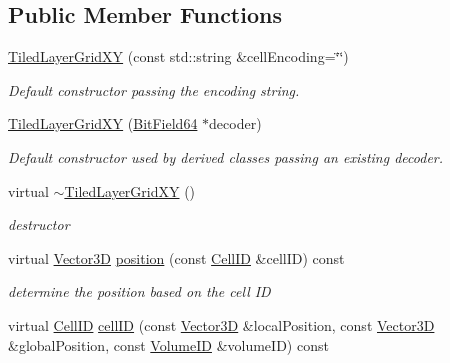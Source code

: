 \subsection*{Public Member Functions}
\begin{DoxyCompactItemize}
\item 
\hyperlink{class_d_d4hep_1_1_d_d_segmentation_1_1_tiled_layer_grid_x_y_acbf674bb93ded0eedfa0d57426af8400}{TiledLayerGridXY} (const std::string \&cellEncoding=\char`\"{}\char`\"{})
\begin{DoxyCompactList}\small\item\em Default constructor passing the encoding string. \item\end{DoxyCompactList}\item 
\hyperlink{class_d_d4hep_1_1_d_d_segmentation_1_1_tiled_layer_grid_x_y_a4ff90dbb3f490c1258513bfb3c26e215}{TiledLayerGridXY} (\hyperlink{class_d_d4hep_1_1_d_d_segmentation_1_1_bit_field64}{BitField64} $\ast$decoder)
\begin{DoxyCompactList}\small\item\em Default constructor used by derived classes passing an existing decoder. \item\end{DoxyCompactList}\item 
virtual \hyperlink{class_d_d4hep_1_1_d_d_segmentation_1_1_tiled_layer_grid_x_y_a03eeb88ffc324d56f3bfac3abb707e62}{$\sim$TiledLayerGridXY} ()
\begin{DoxyCompactList}\small\item\em destructor \item\end{DoxyCompactList}\item 
virtual \hyperlink{struct_d_d4hep_1_1_d_d_segmentation_1_1_vector3_d}{Vector3D} \hyperlink{class_d_d4hep_1_1_d_d_segmentation_1_1_tiled_layer_grid_x_y_a1cf88ec570ea925ca8b324efae04ce04}{position} (const \hyperlink{namespace_d_d4hep_1_1_d_d_segmentation_ac7af071d85cb48820914434a07e21ba1}{CellID} \&cellID) const 
\begin{DoxyCompactList}\small\item\em determine the position based on the cell ID \item\end{DoxyCompactList}\item 
virtual \hyperlink{namespace_d_d4hep_1_1_d_d_segmentation_ac7af071d85cb48820914434a07e21ba1}{CellID} \hyperlink{class_d_d4hep_1_1_d_d_segmentation_1_1_tiled_layer_grid_x_y_a7b37dc7981a6f36fdc67bd2759af7bdb}{cellID} (const \hyperlink{struct_d_d4hep_1_1_d_d_segmentation_1_1_vector3_d}{Vector3D} \&localPosition, const \hyperlink{struct_d_d4hep_1_1_d_d_segmentation_1_1_vector3_d}{Vector3D} \&globalPosition, const \hyperlink{namespace_d_d4hep_1_1_d_d_segmentation_a61a6833a18d1800bdef176595f83e3ba}{VolumeID} \&volumeID) const 

\end{DoxyCompactItemize}
